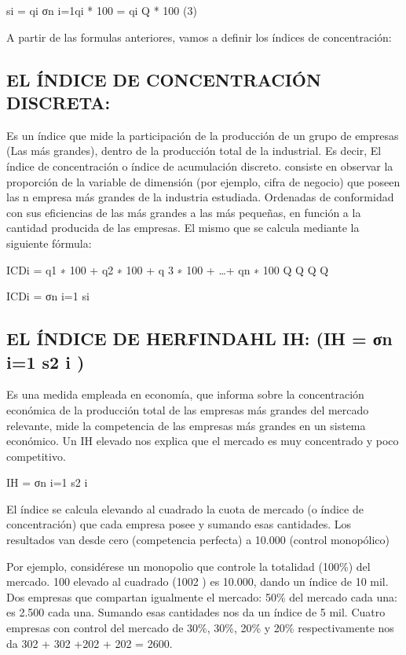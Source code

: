 \documentclass[
  letterpaper,
  DIV=11,
  numbers=noendperiod]{scrartcl}
\begin{document}
si = qi σn i=1qi * 100 = qi Q * 100 (3)

A partir de las formulas anteriores, vamos a definir los índices de
concentración:

\hypertarget{el-uxedndice-de-concentraciuxf3n-discreta}{%
\subsection{EL ÍNDICE DE CONCENTRACIÓN
DISCRETA:}\label{el-uxedndice-de-concentraciuxf3n-discreta}}

Es un índice que mide la participación de la producción de un grupo de
empresas (Las más grandes), dentro de la producción total de la
industrial. Es decir, El índice de concentración o índice de acumulación
discreto. consiste en observar la proporción de la variable de dimensión
(por ejemplo, cifra de negocio) que poseen las n empresa más grandes de
la industria estudiada. Ordenadas de conformidad con sus eficiencias de
las más grandes a las más pequeñas, en función a la cantidad producida
de las empresas. El mismo que se calcula mediante la siguiente fórmula:

ICDi = q1 ∗ 100 + q2 ∗ 100 + q 3 ∗ 100 + \ldots+ qn ∗ 100 Q Q Q Q

ICDi = σn i=1 si

\hypertarget{el-uxedndice-de-herfindahl-ih-ih-ux3c3n-i1-s2-i}{%
\subsection{EL ÍNDICE DE HERFINDAHL IH: (IH = σn i=1 s2 i
)}\label{el-uxedndice-de-herfindahl-ih-ih-ux3c3n-i1-s2-i}}

Es una medida empleada en economía, que informa sobre la concentración
económica de la producción total de las empresas más grandes del mercado
relevante, mide la competencia de las empresas más grandes en un sistema
económico. Un IH elevado nos explica que el mercado es muy concentrado y
poco competitivo.

IH = σn i=1 s2 i

El índice se calcula elevando al cuadrado la cuota de mercado (o índice
de concentración) que cada empresa posee y sumando esas cantidades. Los
resultados van desde cero (competencia perfecta) a 10.000 (control
monopólico)

Por ejemplo, considérese un monopolio que controle la totalidad (100\%)
del mercado. 100 elevado al cuadrado (1002 ) es 10.000, dando un índice
de 10 mil. Dos empresas que compartan igualmente el mercado: 50\% del
mercado cada una: es 2.500 cada una. Sumando esas cantidades nos da un
índice de 5 mil. Cuatro empresas con control del mercado de 30\%, 30\%,
20\% y 20\% respectivamente nos da 302 + 302 +202 + 202 = 2600.
\end{document}
